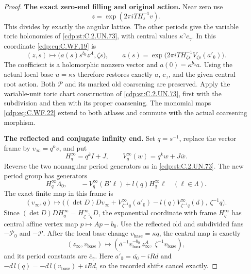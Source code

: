 \begin{proof}
\par\medskip\noindent\textbf{The exact zero-end filling and original action.}
Near zero use
\[
                    z=\exp(2\pi iT H_s^{-1}v).
\tag{C.WF.21}\label{cdp:eq:C.WF.21}
\]
This divides by exactly the angular lattice.
The other periods give the variable toric holonomies
of \ref{cdp:st:C.2.UN.73}, with central values \(\kappa^\gamma c_\gamma\).
In this coordinate \eqref{cdp:eq:C.WF.19} is
\[
 (z,s)\longmapsto
   \bigl(a(s)s^{b_0}z^A,\zeta s\bigr),\qquad
 a(s)=\exp\bigl(2\pi iT H_{\zeta s}^{-1}
                              V_{\zeta s}(a'_0)\bigr).
\tag{C.WF.22}\label{cdp:eq:C.WF.22}
\]
The coefficient is a holomorphic nonzero vector and
\(a(0)=\kappa^{b_0}a\).
Using the actual local base \(u=\kappa s\)
therefore restores exactly \(a\), \(c_\gamma\),
and the given central root action.  Both
\(\mathscr P\) and its marked old coarsening are
preserved.  Apply the variable-unit toric chart
construction of \ref{cdp:st:C.2.UN.73}, first with the subdivision
and then with its proper coarsening.  The monomial
maps \eqref{cdp:eq:C.WF.22} extend to both atlases and commute
with the actual coarsening morphism.

\par\medskip\noindent\textbf{The reflected and conjugate infinity end.}
Set \(q=s^{-1}\), replace the vector frame by
\(v_\infty=q^kv\), and put
\[
 H^\infty_q=q^kI+J,\qquad
 V^\infty_q(w)=q^kw+J\overline w .
\]
Reverse the two nonangular period generators as
in \ref{cdp:st:C.2.UN.73}.  The new period group has generators
\[
 H^\infty_q\Lambda_0,\qquad
 -V^\infty_q(B'\ell)+l(q)H^\infty_q\ell
                 \quad(\ell\in\Lambda).
\tag{C.WF.23}\label{cdp:eq:C.WF.23}
\]
The exact finite map in this frame is
\[
 (v_\infty,q)\longmapsto
 \bigl((\det D)Dv_\infty+
       V^\infty_{\zeta^{-1}q}(a'_0)
       -l(q)V^\infty_{\zeta^{-1}q}(d),\
       \zeta^{-1}q\bigr).
\tag{C.WF.24}\label{cdp:eq:C.WF.24}
\]
Since \((\det D)D H^\infty_q=
H^\infty_{\zeta^{-1}q}D\), the exponential
coordinate with frame \(H^\infty_q\) has central
affine vertex map \(p\mapsto Ap-b_0\).
Use the reflected old and subdivided fans
\(-\mathscr P_0\) and \(-\mathscr P\).
After the local base change \(v_{\mathrm{base}}=\kappa q\),
the central map is exactly
\[
 (z_\infty,v_{\mathrm{base}})
  \longmapsto
  (\overline a^{-1}v_{\mathrm{base}}^{-b_0}
                   z_\infty^A,\ \zeta^{-1}v_{\mathrm{base}}),
\tag{C.WF.25}\label{cdp:eq:C.WF.25}
\]
and its period constants are \(\overline c_\gamma\).
Here \(\overline{a'_0}=\overline{a_0}-iRd\)
and \(-d\,l(q)=-d\,l(v_{\mathrm{base}})+iRd\),
so the recorded shifts cancel exactly.


\end{proof}
